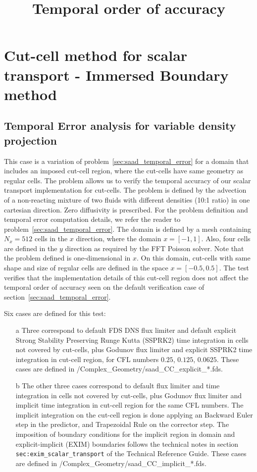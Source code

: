 \documentclass[11pt]{book}
\begin{document}
\section{Cut-cell method for scalar transport - Immersed Boundary method}

\subsection{Temporal Error analysis for variable density projection}

\label{sec:saad_cc_temporal_error}

This case is a variation of problem~\ref{sec:saad_temporal_error} for a domain that includes an imposed cut-cell region, where the cut-cells have same geometry as regular cells. The problem allows us to verify the temporal accuracy of our scalar transport implementation for cut-cells. The problem is defined by the advection of a non-reacting mixture of two fluids with different densities (10:1 ratio) in one cartesian direction. Zero diffusivity is prescribed. For the problem definition and temporal error computation details, we refer the reader to problem~\ref{sec:saad_temporal_error}.
The domain is defined by a mesh containing $N_x=512$ cells in the $x$ direction, where the domain $x=[-1,1]$. Also, four cells are defined in the $y$ direction as required by the FFT Poisson solver. Note that the problem defined is one-dimensional in $x$.
On this domain, cut-cells with same shape and size of regular cells are defined in the space $x=[-0.5,0.5]$. The test verifies that the implementation details of this cut-cell region does not affect the temporal order of accuracy seen on the default verification case of section~\ref{sec:saad_temporal_error}.

\title{Temporal order of accuracy}

Six cases are defined for this test:
%
\begin{enumerate}
 \item[a]  Three correspond to default FDS DNS flux limiter and default explicit Strong Stability Preserving Runge Kutta (SSPRK2) time integration in cells not covered by cut-cells, plus Godunov flux limiter and explicit SSPRK2 time integration in cut-cell region, for CFL numbers $0.25$, $0.125$, $0.0625$. These cases are defined in {\ct /Complex\_Geometry/saad\_CC\_explicit\_*.fds}.

  \item[b] The other three cases correspond to default flux limiter and time integration in cells not covered by cut-cells, plus Godunov flux limiter and implicit time integration in cut-cell region for the same CFL numbers. The implicit integration on the cut-cell region is done applying an Backward Euler step in the predictor, and Trapezoidal Rule on the corrector step. The imposition of boundary conditions for the implicit region in domain and explicit-implicit (EXIM) boundaries follows the technical notes in section \texttt{sec:exim\_scalar\_transport} of the Technical Reference Guide. These cases are defined in {\ct /Complex\_Geometry/saad\_CC\_implicit\_*.fds}.

\end{enumerate}
%
\end{document}
